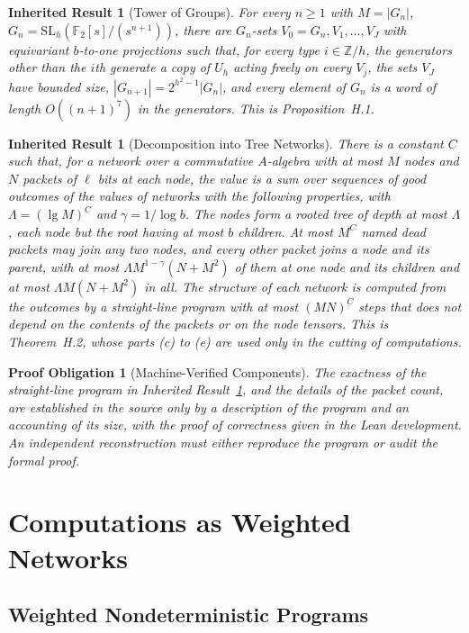 \documentclass[11pt,letterpaper]{report}
\theoremstyle{plain}
\newtheorem{inherited}[theorem]{Inherited Result}
\newtheorem{obligation}[theorem]{Proof Obligation}
\theoremstyle{definition}
\theoremstyle{remark}
\begin{document}
\begin{inherited}[Tower of Groups]
For every $n\ge1$ with $M=|G_n|$, $G_n=\mathrm{SL}_h(\mathbb F_2[s]/(s^{n+1}))$, there are $G_n$-sets $V_0=G_n,V_1,\ldots,V_J$ with equivariant $b$-to-one projections such that, for every type $i\in\mathbb Z/h$, the generators other than the $i$th generate a copy of $U_h$ acting freely on every $V_j$, the sets $V_J$ have bounded size, $|G_{n+1}|=2^{h^2-1}|G_n|$, and every element of $G_n$ is a word of length $O((n+1)^7)$ in the generators. This is Proposition~H.1.
\end{inherited}

\begin{inherited}[Decomposition into Tree Networks]\label{inh:tree}
There is a constant $C$ such that, for a network over a commutative $A$-algebra with at most $M$ nodes and $N$ packets of $\ell$ bits at each node, the value is a sum over sequences of good outcomes of the values of networks with the following properties, with $\Lambda=(\lg M)^C$ and $\gamma=1/\log b$. The nodes form a rooted tree of depth at most $\Lambda$, each node but the root having at most $b$ children. At most $M^C$ named dead packets may join any two nodes, and every other packet joins a node and its parent, with at most $\Lambda M^{1-\gamma}(N+M^2)$ of them at one node and its children and at most $\Lambda M(N+M^2)$ in all. The structure of each network is computed from the outcomes by a straight-line program with at most $(MN)^C$ steps that does not depend on the contents of the packets or on the node tensors. This is Theorem~H.2, whose parts (c) to (e) are used only in the cutting of computations.
\end{inherited}

\begin{obligation}[Machine-Verified Components]
The exactness of the straight-line program in Inherited Result~\ref{inh:tree}, and the details of the packet count, are established in the source only by a description of the program and an accounting of its size, with the proof of correctness given in the Lean development. An independent reconstruction must either reproduce the program or audit the formal proof.
\end{obligation}

\chapter{Computations as Weighted Networks}

\section{Weighted Nondeterministic Programs}
\end{document}
